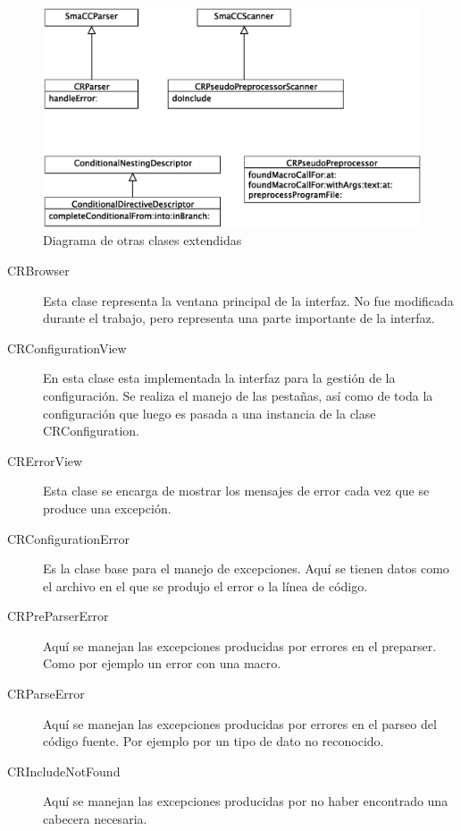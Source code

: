 \documentclass[a4paper,oneside,12pt]{article}
\begin{document}
\begin{figure}[h!]
  \centering
    \includegraphics[scale=0.60]{images/diagrama_clases_extendidas.eps}
    \caption{Diagrama de otras clases extendidas}
    \label{diagrama_de_clases_extendidas}
\end{figure}

\begin{description}
\item[CRBrowser] Esta clase representa la ventana principal de la interfaz. No fue modificada durante el trabajo, pero representa una parte importante de la interfaz.

\item[CRConfigurationView] En esta clase esta implementada la interfaz para la gesti\'on de la configuraci\'on. Se realiza el manejo de las pestañas, as\'i como de toda la configuraci\'on que luego es pasada a una instancia de la clase CRConfiguration.

\item[CRErrorView] Esta clase se encarga de mostrar los mensajes de error cada vez que se produce una excepci\'on.

\item[CRConfigurationError] Es la clase base para el manejo de excepciones. Aqu\'i se tienen datos como el archivo en el que se produjo el error o la l\'inea de c\'odigo.

\item[CRPreParserError] Aqu\'i se manejan las excepciones producidas por errores en el preparser. Como por ejemplo un error con una macro.

\item[CRParseError] Aqu\'i se manejan las excepciones producidas por errores en el parseo del c\'odigo fuente. Por ejemplo por un tipo de dato no reconocido.

\item[CRIncludeNotFound] Aqu\'i se manejan las excepciones producidas por no haber encontrado una cabecera necesaria.

\end{description}
\end{document}
